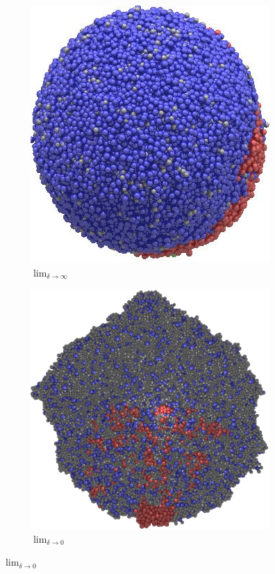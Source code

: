 \begin{figure}[!ht]
\begin{subfigure}[b]{.5\textwidth}
\includegraphics[width=.8\textwidth]{result2/diag1b}
\caption{$\lim_{\delta \to \infty}$}
\end{subfigure}\hspace*{-1.5em}
\centering
\begin{subfigure}[b]{.5\textwidth}
\includegraphics[width=.8\textwidth]{result2/plot366}%
\caption{$\lim_{\delta \to 0}$}
\end{subfigure}\vspace*{-1.5em}


\end{figure}
